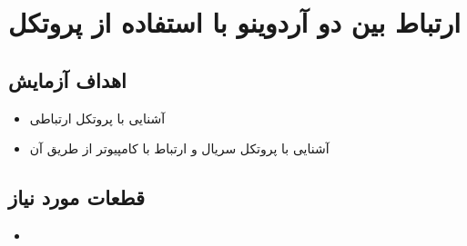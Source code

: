 \section{ارتباط بین دو آردوینو با استفاده از پروتکل }

\subsection{اهداف آزمایش}
\begin{itemize}
    \item آشنایی با پروتکل ارتباطی 
    \item آشنایی با پروتکل سریال و ارتباط با کامپیوتر از طریق آن
\end{itemize}

\subsection{قطعات مورد نیاز}
\begin{itemize}
    \item {}
\end{itemize}

